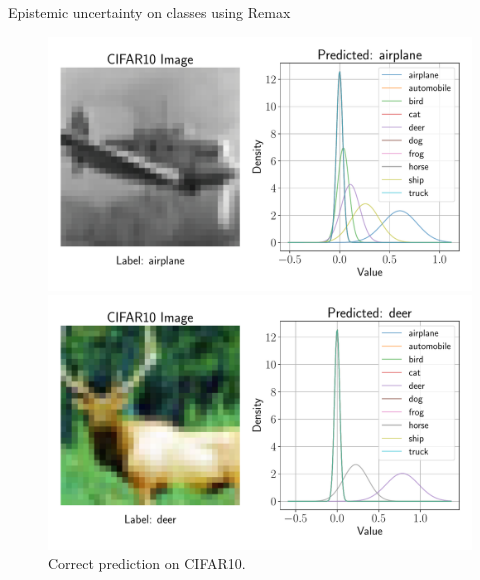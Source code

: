 \documentclass[final]{beamer}
\begin{document}
\begin{frame}[t]
\begin{columns}
\begin{column}[T]{.31\textwidth}
\begin{block}{Epistemic uncertainty on classes using Remax}
\begin{figure}[h]
    \centering
    \begin{minipage}[b]{0.5\textwidth}
        \includegraphics[width=\textwidth]{airplane}
        \caption*{Correct prediction on CIFAR10.}
    \end{minipage}\hfill
    \begin{minipage}[b]{0.5\textwidth}
        \includegraphics[width=\textwidth]{deer}
        \caption*{Correct prediction on CIFAR10.}
    \end{minipage}
\end{figure}


\end{block}
\end{column}
\end{columns}
\end{frame}
\end{document}
